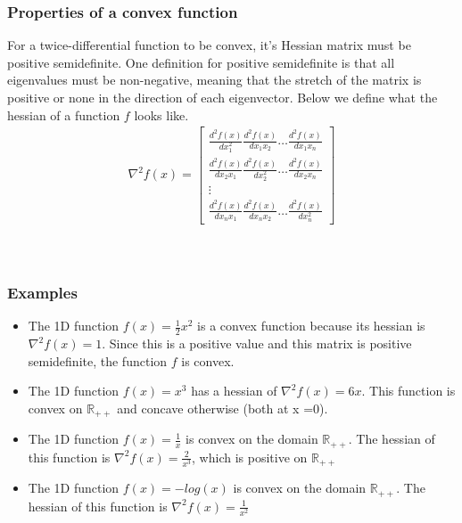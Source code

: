 \subsubsection{Properties of a convex function}
For a twice-differential function to be convex, it's Hessian matrix must be positive semidefinite. One definition for positive semidefinite is that all eigenvalues must be non-negative, meaning that the stretch of the matrix is positive or none in the direction of each eigenvector. Below we define what the hessian of a function $f$ looks like.
\begin{align}
  \nabla^2 f(x) = 
  \begin{bmatrix}
     \frac{d^2 f(x)}{d x_1^2 } \frac{d^2 f(x)}{d x_1 x_2 } \dots \frac{d^2 f(x)}{d x_1 x_n} \\
     \frac{d^2 f(x)}{d x_2 x_1 } \frac{d^2 f(x)}{d x_2^2} \dots \frac{d^2 f(x)}{d x_2 x_n} \\
     \vdots\\
     \frac{d^2 f(x)}{d x_n x_1 } \frac{d^2 f(x)}{d x_n x_2} \dots \frac{d^2 f(x)}{d x_n^2}    
  \end{bmatrix}
\end{align}
\\ \\

\subsubsection{Examples}
\begin{itemize}
  \item The 1D function $f(x) = \frac{1}{2}x^2$ is a convex function because its hessian is $\nabla^2 f(x) = 1$. Since this is a positive value and this matrix is positive semidefinite, the function $f$ is convex. 
  \item The 1D function $f(x) = x^3$ has a hessian of $\nabla^2 f(x) = 6x$. This function is convex on $\mathbb{R}_{++}$ and concave otherwise (both at x =0).
  \item The 1D function $f(x) = \frac{1}{x}$ is convex on the domain $\mathbb{R_{++}}$. The hessian of this function is $\nabla^2 f(x) = \frac{2}{x^3}$, which is positive on $\mathbb{R_{++}}$
  \item The 1D function $f(x) = -log(x)$ is convex on the domain $\mathbb{R_{++}}$. The hessian of this function is $\nabla^2 f(x) = \frac{1}{x^2}$
\end{itemize}

